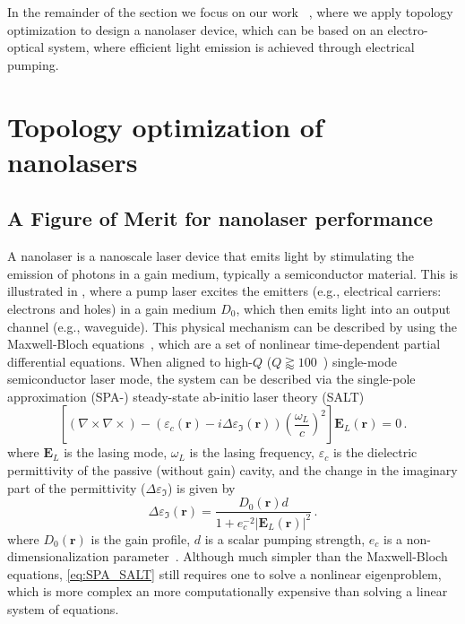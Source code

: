 In the remainder of the section we focus on our work~\cite{ownpub4} , where we apply topology 
optimization to design a nanolaser device, which can be based on an electro-optical system, where
 efficient light emission is achieved through electrical pumping.

\section{Topology optimization of nanolasers~\cite{ownpub4}}\label{sec:laser}

\subsection*{A Figure of Merit for nanolaser performance}

A nanolaser is a nanoscale laser device that emits light by stimulating the emission of photons in a gain medium, typically a semiconductor material. This is illustrated
in , where a pump laser excites the emitters (e.g., electrical carriers: electrons and holes) in a gain medium $D_0$, which then emits light into an output channel (e.g., waveguide). This physical
mechanism can be described by using the Maxwell-Bloch equations~\cite{haken_laser_dynamics, PhysRev.134.A1429, SALT_original}, which are a set of nonlinear time-dependent 
partial differential equations. When aligned to high-$Q$ ($Q\gtrapprox 100$~\cite{cerjan_2016}) single-mode semiconductor laser
mode, the system can be described via the single-pole approximation (SPA-) steady-state ab-initio laser theory (SALT)~\cite{Ge_2010}
\begin{equation}\label{eq:SPA_SALT}
    {\left[(\nabla \times 
     \nabla \times ) -\left(\varepsilon_c(\mathbf{r})-i \Delta \varepsilon_\Im (\mathbf{r})\right) \left(\frac{\omega_L}{c}\right)^2\right] \mathbf{E}_L(\mathbf{r})=0}\,.
\end{equation}
where $\mathbf{E}_L$ is the lasing mode, $\omega_L$ is the lasing frequency, $\varepsilon_c$ is the dielectric permittivity of the passive (without gain) cavity, and the change in the 
imaginary part of the permittivity ($\Delta \varepsilon_\Im$) is given by
\begin{equation}\label{eq:gain_SALT}
        \Delta \varepsilon_\Im (\mathbf{r}) =  \frac{D_0(\mathbf{r}) d}{1+ e_c^{-2}\left|\mathbf{E}_L(\mathbf{r})\right|^2}\,.
\end{equation}
where $D_0(\mathbf{r})$ is the gain profile, $d$ is a scalar pumping strength, $e_c$ is a non-dimensionalization parameter~\cite{Ge_2010}. Although much simpler than the Maxwell-Bloch equations, \eqref{eq:SPA_SALT} still
requires one to solve a nonlinear eigenproblem, which is more complex an more computationally expensive than solving a linear system of equations.

